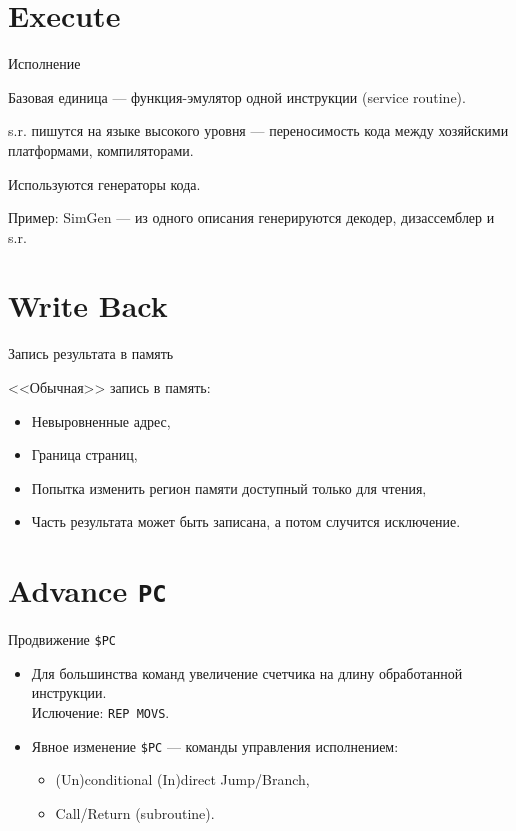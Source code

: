\documentclass{beamer}
\begin{document}
\section{Execute}

\begin{frame}{Исполнение}

Базовая единица — функция-эмулятор одной инструкции (service routine).

\bigskip

s.r. пишутся на языке высокого уровня — переносимость кода между хозяйскими
платформами, компиляторами.

\bigskip

Используются генераторы кода.

Пример: SimGen — из одного описания генерируются декодер, дизассемблер и s.r.

\end{frame}

\section{Write Back}

\begin{frame}{Запись результата в память}

<<Обычная>> запись в память:

\pause

\begin{itemize}
    \item Невыровненные адрес,
    \item Граница страниц,
    \item Попытка изменить регион памяти доступный только для чтения,
    \item Часть результата может быть записана, а потом случится исключение.
\end{itemize}

\end{frame}

\section{Advance \texttt{PC}}

\begin{frame}{Продвижение \texttt{\$PC}}

\begin{itemize}
    \item Для большинства команд увеличение счетчика на длину обработанной инструкции. \\
    Ислючение: \texttt{REP MOVS}.
    \pause\bigskip
    \item Явное изменение \texttt{\$PC} — команды управления исполнением:
    \begin{itemize}
        \item (Un)conditional (In)direct Jump/Branch,
        \item Call/Return (subroutine).
    \end{itemize}
\end{itemize}

\end{frame}
\end{document}
